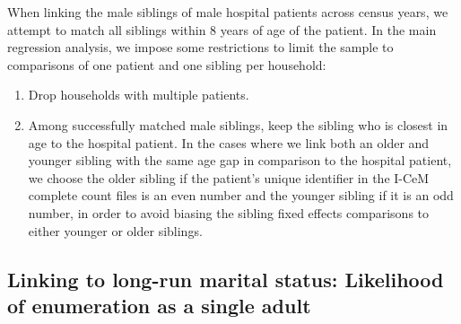 \documentclass[12pt,english]{article}
\begin{document}
When linking the male siblings of male hospital patients across census years, we attempt to match all siblings within 8 years of age of the patient. In the main regression analysis, we impose some restrictions to limit the sample to comparisons of one patient and one sibling per household:
\begin{enumerate}
    \item Drop households with multiple patients.
    \item Among successfully matched male siblings, keep the sibling who is closest in age to the hospital patient. In the cases where we link both an older and younger sibling with the same age gap in comparison to the hospital patient, we choose the older sibling if the patient's unique identifier in the I-CeM complete count files is an even number and the younger sibling if it is an odd number, in order to avoid biasing the sibling fixed effects comparisons to either younger or older siblings.
\end{enumerate}

\subsection{Linking to long-run marital status: Likelihood of enumeration as a single adult \label{subsubsec:link-marital-status}}
\end{document}
